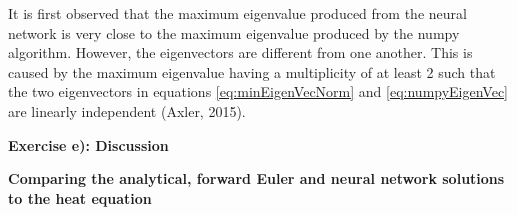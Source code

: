 \documentclass[12pt,a4paper]{article}
\begin{document}
\noindent It is first observed that the maximum eigenvalue produced from the neural network is very close to the maximum eigenvalue produced by the numpy algorithm. However, the eigenvectors are different from one another. This is caused by the maximum eigenvalue having a multiplicity of at least 2 such that the two eigenvectors in equations \ref{eq:minEigenVecNorm} and \ref{eq:numpyEigenVec} are linearly independent (Axler, 2015). 

\newpage

\begin{center}
\Large{\textbf{Exercise e): Discussion}}
\end{center}

\begin{center}
\large{\textbf{Comparing the analytical, forward Euler and neural network solutions to the heat equation}}
\end{center}
\end{document}

